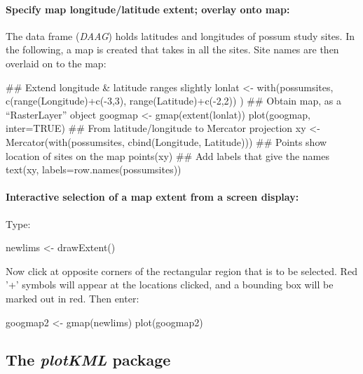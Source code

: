 \paragraph{Specify map longitude/latitude extent; overlay onto map:}
The data frame  ({\em DAAG}) holds latitudes and
longitudes of possum study sites.  In the
following, a map is created that takes in all the sites.  Site
names are then overlaid on to the map: 
\begin{Schunk}
\begin{Sinput}
## Extend longitude & latitude ranges slightly
lonlat <- with(possumsites,
               c(range(Longitude)+c(-3,3),
                 range(Latitude)+c(-2,2))
)
## Obtain map, as a ``RasterLayer'' object
googmap <- gmap(extent(lonlat))
plot(googmap, inter=TRUE)
## From latitude/longitude to Mercator projection
xy <- Mercator(with(possumsites,
                    cbind(Longitude, Latitude)))
## Points show location of sites on the map
points(xy)
## Add labels that give the names
text(xy, labels=row.names(possumsites))
\end{Sinput}
\end{Schunk}

\paragraph{Interactive selection of a map extent from a screen display:}
Type:
\begin{Schunk}
\begin{Sinput}
newlims <- drawExtent()
\end{Sinput}
\end{Schunk}
Now click at opposite corners  of the rectangular region
that is to be selected.  Red '+' symbols will appear at the locations
clicked, and a bounding box will be marked out in red.  Then enter:
\begin{Schunk}
\begin{Sinput}
googmap2 <- gmap(newlims)
plot(googmap2)
\end{Sinput}
\end{Schunk}

\subsection{The {\em plotKML} package}

